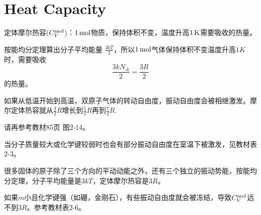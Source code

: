 \documentclass[CJK]{beamer}
\begin{document}
\section{Heat Capacity}


\begin{frame}
\bch
    {\large
      {\blue 定体摩尔热容($C_V^{\rm mol}$)：$1\,\mathrm{mol}$物质，保持体积不变，温度升高$1\,\mathrm{K}$需要吸收的热量。}

      \skipline
      
      按能均分定理算出分子平均能量 $\frac{3kT}{2}$，所以$1\,\mathrm{mol}$气体保持体积不变温度升高$1K$时，需要吸收
      $$ \frac{3kN_A}{2} = \frac{3R}{2}$$
      的热量。
}
\ech
\end{frame}


\begin{frame}
\bch
如果从低温开始到高温，双原子气体的转动自由度，振动自由度会被相继激发。摩尔定体热容就从$\frac{3}{2}R$增长到$\frac{5}{2}R$再到$\frac{7}{2}R$.


请再参考教材85页 图2-14。

当分子质量较大或化学键较弱时也会有部分振动自由度在室温下被激发，见教材表2-3。
\ech
\end{frame}



\begin{frame}
\bch
    {\large

      很多固体的原子除了三个方向的平动动能之外，还有三个独立的振动势能，按能均分定理，分子平均能量是$3kT$，定体摩尔热容是$3R$。

    \skipline
    
    如果$m$小且化学键强（如硼，金刚石），有些振动自由度就会被冻结，导致$C_V^{\rm mol}$远不到$3R$。参考教材表2-6。

}
\ech
\end{frame}
\end{document}
